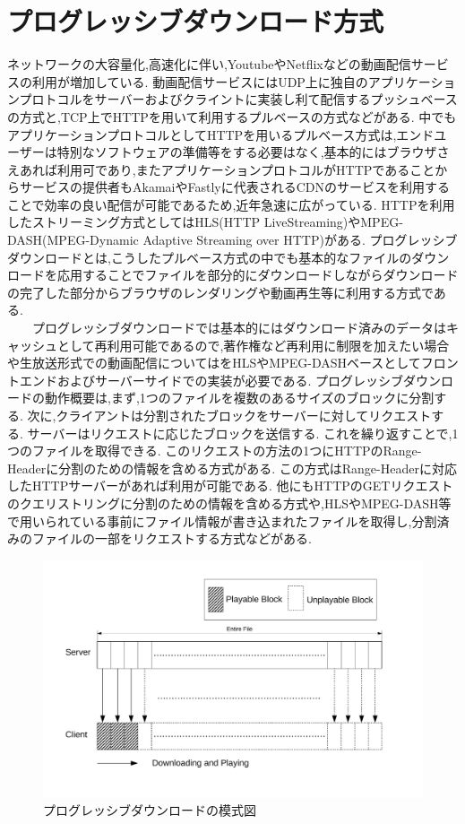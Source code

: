 \documentclass[a4j,12pt]{gradthesis_utf8}
\begin{document}
\section{プログレッシブダウンロード方式}
ネットワークの大容量化,高速化に伴い,Youtube\cite{youtube}やNetflix\cite{netflix}などの動画配信サービスの利用が増加している.
動画配信サービスにはUDP上に独自のアプリケーションプロトコルをサーバーおよびクライントに実装し利て配信するプッシュベースの方式と,TCP上でHTTPを用いて利用するプルベースの方式などがある.
中でもアプリケーションプロトコルとしてHTTPを用いるプルベース方式は,エンドユーザーは特別なソフトウェアの準備等をする必要はなく,基本的にはブラウザさえあれば利用可であり,またアプリケーションプロトコルがHTTPであることからサービスの提供者もAkamaiやFastlyに代表されるCDNのサービスを利用することで効率の良い配信が可能であるため,近年急速に広がっている.
HTTPを利用したストリーミング方式としてはHLS(HTTP LiveStreaming)\cite{hls}やMPEG-DASH(MPEG-Dynamic Adaptive Streaming over HTTP)\cite{dash}がある.
プログレッシブダウンロードとは,こうしたプルベース方式の中でも基本的なファイルのダウンロードを応用することでファイルを部分的にダウンロードしながらダウンロードの完了した部分からブラウザのレンダリングや動画再生等に利用する方式である.\\
\ \ \ \ プログレッシブダウンロードでは基本的にはダウンロード済みのデータはキャッシュとして再利用可能であるので,著作権など再利用に制限を加えたい場合や生放送形式での動画配信についてはをHLSやMPEG-DASHベースとしてフロントエンドおよびサーバーサイドでの実装が必要である.
プログレッシブダウンロードの動作概要は,まず,1つのファイルを複数のあるサイズのブロックに分割する.
次に,クライアントは分割されたブロックをサーバーに対してリクエストする.
サーバーはリクエストに応じたブロックを送信する.
これを繰り返すことで,1つのファイルを取得できる.
このリクエストの方法の1つにHTTPのRange-Headerに分割のための情報を含める方式がある.
この方式はRange-Headerに対応したHTTPサーバーがあれば利用が可能である.
他にもHTTPのGETリクエストのクエリストリングに分割のための情報を含める方式や,HLSやMPEG-DASH等で用いられている事前にファイル情報が書き込まれたファイルを取得し,分割済みのファイルの一部をリクエストする方式などがある.

\begin{figure}[h]
	\centering
	\includegraphics[width=16cm]{figure/p-dl.pdf}
	\caption{プログレッシブダウンロードの模式図}
	\label{p-dl}
\end{figure}
\end{document}
